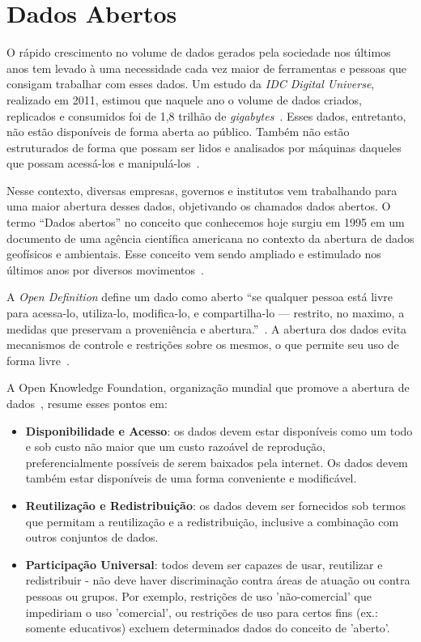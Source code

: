 \chapter{Dados Abertos}

O rápido crescimento no volume de dados gerados pela sociedade nos últimos anos tem levado à uma necessidade cada vez maior de ferramentas e pessoas que consigam trabalhar com esses dados. Um estudo da \emph{IDC Digital Universe}, realizado em 2011, estimou que naquele ano o volume de dados criados, replicados e consumidos foi de 1,8 trilhão de \emph{gigabytes}~\cite{gantz2012digital}. Esses dados, entretanto, não estão disponíveis de forma aberta ao público. Também não estão estruturados de forma que possam ser lidos e analisados por máquinas daqueles que possam acessá-los e manipulá-los~\cite{seijiconectados}. 

Nesse contexto, diversas empresas, governos e institutos vem trabalhando para uma maior abertura desses dados, objetivando os chamados dados abertos. O termo \enquote{Dados abertos} no conceito que conhecemos hoje surgiu em 1995 em um documento de uma agência científica americana no contexto da abertura de dados geofísicos e ambientais. Esse conceito vem sendo ampliado e estimulado nos últimos anos por diversos movimentos~\cite{seijiconectados}. 

A \emph{Open Definition} define um dado como aberto \enquote{se qualquer pessoa está livre para acessa-lo, utiliza-lo, modifica-lo, e compartilha-lo — restrito, no maximo, a medidas que preservam a proveniência e abertura.}~\cite{opendefinition}. A abertura dos dados evita mecanismos de controle e restrições sobre os mesmos, o que permite seu uso de forma livre~\cite{seijiconectados}.

A Open Knowledge Foundation, organização mundial que promove a abertura de dados~\cite{openknowledge}, resume esses pontos em:

\begin{itemize}
\item \textbf{Disponibilidade e Acesso}: os dados devem estar disponíveis como um todo e sob custo não maior que um custo razoável de reprodução, preferencialmente possíveis de serem baixados pela internet. Os dados devem também estar disponíveis de uma forma conveniente e modificável.

\item \textbf{Reutilização e Redistribuição}: os dados devem ser fornecidos sob termos que permitam a reutilização e a redistribuição, inclusive a combinação com outros conjuntos de dados.

\item \textbf{Participação Universal}: todos devem ser capazes de usar, reutilizar e redistribuir - não deve haver discriminação contra áreas de atuação ou contra pessoas ou grupos. Por exemplo, restrições de uso 'não-comercial' que impediriam o uso 'comercial', ou restrições de uso para certos fins (ex.: somente educativos) excluem determinados dados do conceito de 'aberto'.
\end{itemize}

